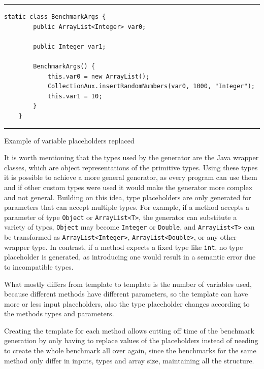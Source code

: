 \begin{listing}[htbp]
\noindent\rule{\linewidth}{0.4pt}
\begin{verbatim}
static class BenchmarkArgs {
        public ArrayList<Integer> var0;

        public Integer var1;

        BenchmarkArgs() {
            this.var0 = new ArrayList();
            CollectionAux.insertRandomNumbers(var0, 1000, "Integer");
            this.var1 = 10;
        }
    }
\end{verbatim}
\noindent\rule{\linewidth}{0.4pt}
\caption{Example of variable placeholders replaced}            
\label{lst:var_placeholders_replaced}
\end{listing}



It is worth mentioning that the types used by the generator are the Java wrapper classes, which are object representations of the primitive types. Using these types it is possible to achieve a more general generator, as every program can use them and if other custom types were used it would make the generator more complex and not general. Building on this idea, type placeholders are only generated for parameters that can accept multiple types. For example, if a method accepts a parameter of type \texttt{Object} or \texttt{ArrayList<T>}, the generator can substitute a variety of types, \texttt{Object} may become \texttt{Integer} or \texttt{Double}, and \texttt{ArrayList<T>} can be transformed as \texttt{ArrayList<Integer>}, \texttt{ArrayList<Double>}, or any other wrapper type. In contrast, if a method expects a fixed type like \texttt{int}, no type placeholder is generated, as introducing one would result in a semantic error due to incompatible types.

What mostly differs from template to template is the number of variables used, because different methods have different parameters, so the template can have more or less input placeholders, also the type placeholder changes according to the methods types and parameters.


Creating the template for each method allows cutting off time of the benchmark generation by only having to replace values of the placeholders instead of needing to create the whole benchmark all over again, since the benchmarks for the same method only differ in inputs, types and array size, maintaining all the structure.

